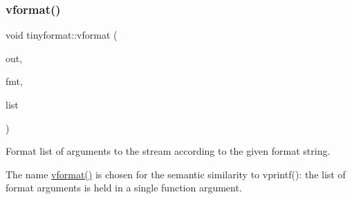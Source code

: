 \mbox{\label{namespacetinyformat_a86ed74eb3ed66a662e96220d877da964}} 
\subsubsection{\texorpdfstring{vformat()}{vformat()}}
{\footnotesize\ttfamily void tinyformat\+::vformat (\begin{DoxyParamCaption}\item[{std\+::ostream \&}]{out,  }\item[{const char $\ast$}]{fmt,  }\item[{\mbox{\hyperlink{namespacetinyformat_ac2ce88095d287d22004006ed25117e0e}{Format\+List\+Ref}}}]{list }\end{DoxyParamCaption})\hspace{0.3cm}{\ttfamily [inline]}}

Format list of arguments to the stream according to the given format string.

The name \mbox{\hyperlink{namespacetinyformat_a86ed74eb3ed66a662e96220d877da964}{vformat()}} is chosen for the semantic similarity to vprintf()\+: the list of format arguments is held in a single function argument. 